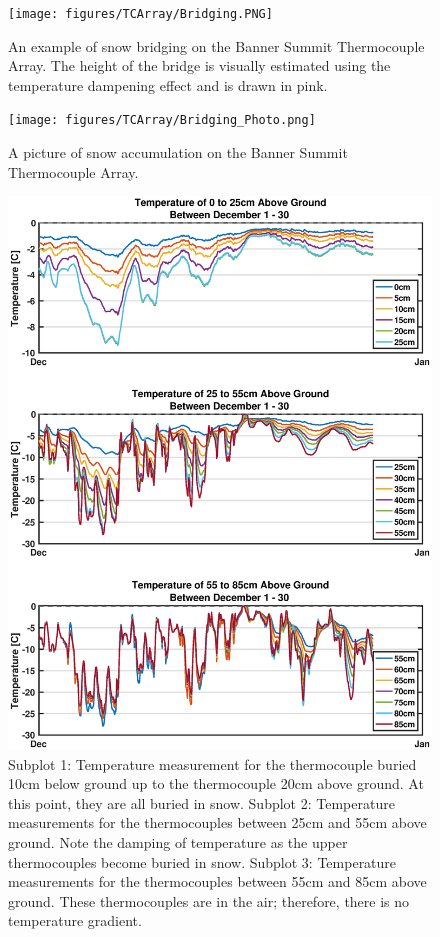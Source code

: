 \begin{figure}[H]
    \centering
    \texttt{[image: figures/TCArray/Bridging.PNG]}
    \caption{An example of snow bridging on the Banner Summit Thermocouple Array. The height of the bridge is visually estimated using the temperature dampening effect and is drawn in pink.}
    \label{fig:Bridging_Heatmap}
 \end{figure}
 
 \begin{figure}[H]
    \centering
    \texttt{[image: figures/TCArray/Bridging\_Photo.png]}
    \caption{A picture of snow accumulation on the Banner Summit Thermocouple Array.}
    \label{fig:Bridging_Photo}
 \end{figure}

\begin{figure}[H]
    \centering
    \includegraphics[width=0.9\linewidth]{figures/TCArray/Dec1_30_TC.eps}
    \caption{Subplot 1: Temperature measurement for the thermocouple buried 10cm below ground up to the thermocouple 20cm above ground. At this point, they are all buried in snow. Subplot 2: Temperature measurements for the thermocouples between 25cm and 55cm above ground. Note the damping of temperature as the upper thermocouples become buried in snow. Subplot 3: Temperature measurements for the thermocouples between 55cm and 85cm above ground. These thermocouples are in the air; therefore, there is no temperature gradient.}
    \label{fig:Dec1_30_TC}
 \end{figure}

